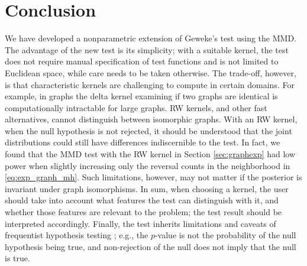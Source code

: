 \documentclass{article}
\begin{document}
\section{Conclusion}
\label{sec:conclusion}
We have developed a nonparametric extension of Geweke's test using the MMD.   
The advantage of the new test is its simplicity; with a suitable kernel, the test does not require manual specification of test functions and is not limited to Euclidean space, while care needs to be taken otherwise. The trade-off, however, is that characteristic kernels are challenging to compute in certain domains.
For example, in graphs the delta kernel examining if two graphs are identical is computationally intractable for large graphs. 
RW kernels, and other fast alternatives, cannot distinguish between isomorphic graphs. 
With an RW kernel, when the null hypothesis is not rejected, it should be understood that the joint distributions could still have differences indiscernible to the test. 
In fact, we found that the MMD test with the RW kernel in Section \ref{sec:graphexp} had low power when slightly increasing only the reversal counts in the neighborhood in \eqref{eq:exp_graph_mh}. 
Such limitations, however, may not matter if the posterior is invariant under graph isomorphisms. 
In sum, when choosing a kernel, the user should take into account what features the test can distinguish with it, and whether those features are relevant to the problem; the test result should be interpreted accordingly. 
Finally, the test inherits limitations and caveats of frequentist hypothesis testing \cite{lehmann_testing_2005, Wasserstein_2016}; e.g., the $p$-value is not the probability of the null hypothesis being true, and non-rejection of the null does not imply that the null is true. 
\end{document}
